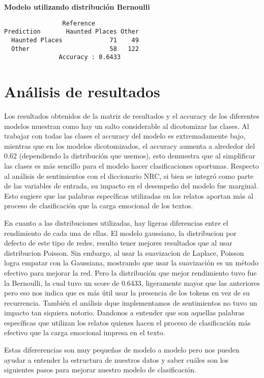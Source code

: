 \documentclass[eng]{ajceam-class}
\begin{document}
\textbf{Modelo utilizando distribución Bernoulli}
\begin{verbatim}
                Reference
Prediction       Haunted Places Other
  Haunted Places             71    49
  Other                      58   122     
               Accuracy : 0.6433
\end{verbatim}

\section{Análisis de resultados}

Los resultados obtenidos de la matriz de resultados y el accuracy de los diferentes modelos muestran como hay un salto considerable al dicotomizar las clases. Al trabajar con todas las clases el accuracy del modelo es extremadamente bajo, mientras que en los modelos dicotomizados, el accuracy aumenta a alrededor del 0.62 (dependiendo la distribución que usemos), esto demuestra que al simplificar las clases es más sencillo para el modelo hacer clasificaciones oportunas. Respecto al análisis de sentimientos con el diccionario NRC, si bien se integró como parte de las variables de entrada, su impacto en el desempeño del modelo fue marginal. Esto sugiere que las palabras específicas utilizadas en los relatos aportan más al proceso de clasificación que la carga emocional de los textos.

En cuanto a las distribuciones utilizadas, hay ligeras diferencias entre el rendimiento de cada una de ellas. El modelo gaussiano, la distribucion por defecto de este tipo de redes, resulto tener mejores resultados que al usar distribucion Poisson. Sin embargo, al usar la suavizacion de Laplace, Poisson logra empatar con la Gaussiana, mostrando que usar la suavización es un método efectivo para mejorar la red. Pero la distribución que mejor rendimiento tuvo fue la Bernoulli, la cual tuvo un score de 0.6433, ligeramente mayor que las anteriores pero eso nos indica que es más útil usar la presencia de los tokens en vez de su recurrencia. También el análisis dque implementamos de sentimientos no tuvo un impacto tan siquiera notorio. Dandonos a entender que son aquellas palabras específicas que utilizan los relatos quienes hacen el proceso de clasificación más efectivo que la carga emocional impresa en el texto.

Estas difererencias son muy pequeñas de modelo a modelo pero nos pueden ayudar a entender la estructura de nuestros datos y saber cuáles son los siguientes pasos para mejorar nuestro modelo de clasificación.
\end{document}
